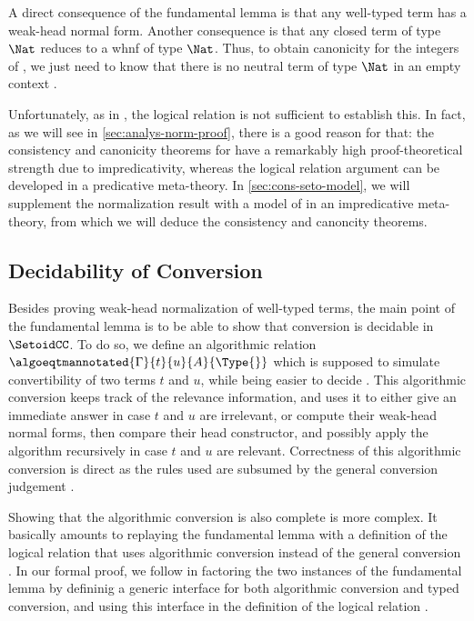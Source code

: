 A direct consequence of the fundamental lemma is that any well-typed
term has a weak-head normal form.
%
Another consequence is that any closed
term of type $\Nat$ reduces to a whnf of type $\Nat$. Thus, to
obtain canonicity for the integers of \SetoidCC, we just need to
know that there is no neutral term of type $\Nat$ in an empty context
.

Unfortunately, as in , the logical relation
is not sufficient to establish this. In fact, as we will see in \cref{sec:analys-norm-proof}, there is a good reason for that: the
consistency and canonicity theorems for \SetoidCC have a remarkably high
proof-theoretical strength due to impredicativity, whereas the
logical relation argument can be developed in a predicative
meta-theory.
%
In \cref{sec:cons-seto-model}, we will supplement
 the normalization result with
a model of \SetoidCC in an impredicative meta-theory, from which
we will deduce the consistency and canoncity theorems.

\subsection{Decidability of Conversion}

Besides proving weak-head normalization of well-typed terms, the
main point of the fundamental lemma is to be able to show that
conversion is decidable in $\SetoidCC$.
%
To do so, we define an algorithmic relation
$\algoeqtmannotated{\Gamma}{t}{u}{A}{\Type{}}$ which is supposed to
simulate convertibility of two terms $t$ and $u$, while being
easier to decide .
%
This algorithmic conversion keeps track of the relevance information,
and uses it to either give an immediate answer in case \( t \) and
\( u \) are irrelevant, or compute their weak-head normal forms, then
compare their head constructor, and possibly apply the algorithm
recursively in case \( t \) and \( u \) are relevant.
%
Correctness of this algorithmic conversion is direct as the rules used are
subsumed by the general conversion judgement .

Showing that the algorithmic conversion is also complete is more complex.
%
It basically amounts to replaying the fundamental lemma with a definition of the logical
relation that uses algorithmic conversion instead of the general conversion
.
%
In our formal proof, we follow  in factoring the two
instances of the fundamental lemma by defininig a generic interface for both
algorithmic conversion and typed conversion, and using this interface
in the definition of the logical relation .

